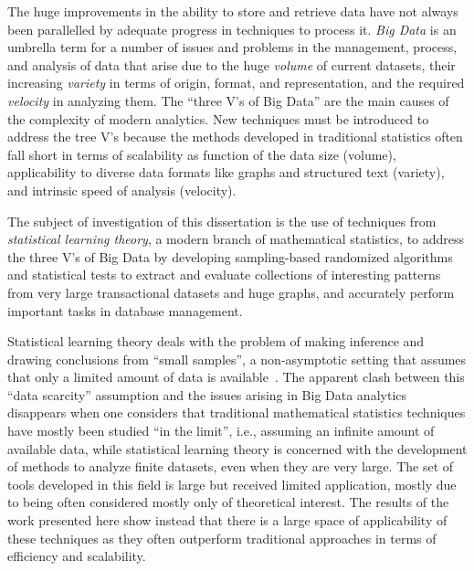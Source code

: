 The huge improvements in the ability to store and retrieve data have
not always been parallelled by adequate progress in techniques to process it.
\emph{Big Data} is an umbrella term for a number of issues and problems in the
management, process, and analysis of data that arise due to the huge
\emph{volume} of current datasets, their increasing \emph{variety} in terms of
origin, format, and representation, and the required \emph{velocity} in
analyzing them. The ``three V's of Big Data'' are the main causes of the
complexity of modern analytics. New techniques must be introduced to address the
tree V's because the methods developed in traditional statistics often fall short in
terms of scalability as function of the data size (volume), applicability to
diverse data formats like graphs and structured text (variety), and intrinsic
speed of analysis (velocity).

The subject of investigation of this dissertation is the use of techniques from
\emph{statistical learning theory}, a modern branch of mathematical statistics,
to address the three V's of Big Data by developing sampling-based randomized
algorithms and statistical tests to extract and evaluate collections of
interesting patterns from very large transactional datasets and huge graphs, and
accurately perform important tasks in database management. 

Statistical learning theory deals with the problem of making inference and
drawing conclusions from ``small samples'', a non-asymptotic setting that
assumes that only a limited amount of data is
available~\cite{Vapnik98,Vapnik99}. The apparent clash between this ``data
scarcity'' assumption and the issues arising in Big Data analytics disappears
when one considers that traditional mathematical statistics techniques have
mostly been studied ``in the limit'', i.e., assuming an infinite amount of
available data, while statistical learning theory is concerned with the
development of methods to analyze finite datasets, even when they are very
large. The set of tools developed in this field is large but received limited
application, mostly due to being often considered mostly only of theoretical
interest. The results of the work presented here show instead that there is a
large space of applicability of these techniques as they often outperform
traditional approaches in terms of efficiency and scalability.

